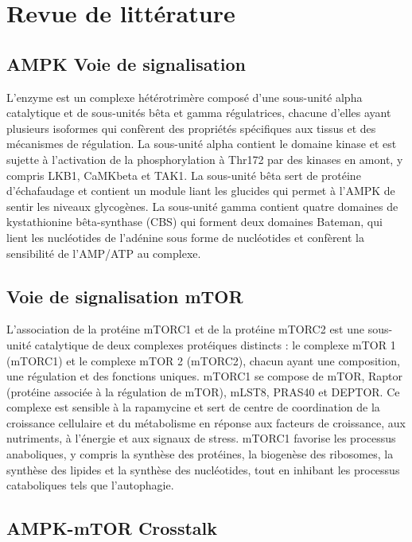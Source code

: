 \documentclass[11pt,a4paper]{article}
\begin{document}
\section{Revue de littérature}

\subsection{AMPK Voie de signalisation}

L'enzyme est un complexe hétérotrimère composé d'une sous-unité alpha catalytique et de sous-unités bêta et gamma régulatrices, chacune d'elles ayant plusieurs isoformes qui confèrent des propriétés spécifiques aux tissus et des mécanismes de régulation. La sous-unité alpha contient le domaine kinase et est sujette à l'activation de la phosphorylation à Thr172 par des kinases en amont, y compris LKB1, CaMKbeta et TAK1. La sous-unité bêta sert de protéine d'échafaudage et contient un module liant les glucides qui permet à l'AMPK de sentir les niveaux glycogènes. La sous-unité gamma contient quatre domaines de kystathionine bêta-synthase (CBS) qui forment deux domaines Bateman, qui lient les nucléotides de l'adénine sous forme de nucléotides et confèrent la sensibilité de l'AMP/ATP au complexe.

\subsection{Voie de signalisation mTOR}

L'association de la protéine mTORC1 et de la protéine mTORC2 est une sous-unité catalytique de deux complexes protéiques distincts : le complexe mTOR 1 (mTORC1) et le complexe mTOR 2 (mTORC2), chacun ayant une composition, une régulation et des fonctions uniques. mTORC1 se compose de mTOR, Raptor (protéine associée à la régulation de mTOR), mLST8, PRAS40 et DEPTOR. Ce complexe est sensible à la rapamycine et sert de centre de coordination de la croissance cellulaire et du métabolisme en réponse aux facteurs de croissance, aux nutriments, à l'énergie et aux signaux de stress. mTORC1 favorise les processus anaboliques, y compris la synthèse des protéines, la biogenèse des ribosomes, la synthèse des lipides et la synthèse des nucléotides, tout en inhibant les processus cataboliques tels que l'autophagie.

\subsection{AMPK-mTOR Crosstalk}
\end{document}
